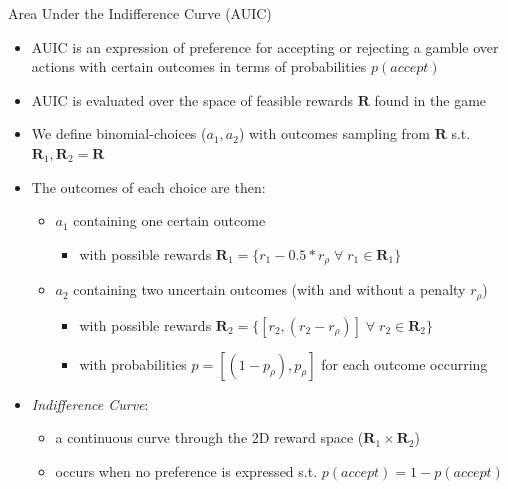 \documentclass[aspectratio=1610, xcolor=dvipsnames]{packages/beamer}
\begin{document}
\begin{frame}{Area Under the Indifference Curve (AUIC)}

        \begin{itemize}
            \item \ac{AUIC} is an expression of preference for accepting or rejecting a gamble over actions with certain outcomes in terms of probabilities $p(accept)$
            \item \ac{AUIC} is evaluated over the space of feasible rewards $\mathbf{R}$ found in the game
            \item We define binomial-choices ($a_1,a_2$) with outcomes sampling from $\mathbf{R}$ s.t. $\mathbf{R}_{1},\mathbf{R}_{2} = \mathbf{R}$
            \item The outcomes of each choice are then:
            \begin{itemize}
                \item $a_{1}$ containing one certain outcome
                \begin{itemize}
                    \item  with possible rewards $\mathbf{R}_{1} = \{r_1 -0.5*r_{\rho} \;\forall\; r_1 \in \mathbf{R}_{1}\}$
                \end{itemize}
                \item $a_{2}$ containing two uncertain outcomes (with and without a penalty $r_\rho$)
                \begin{itemize}
                    \item with possible rewards $\mathbf{R}_{2} = \{[r_2,(r_2 -r_\rho)] \;\forall\; r_2 \in\mathbf{R}_2\}$
                    \item with probabilities $p = [(1-p_{\rho}),p_{\rho}]$ for each outcome occurring
                \end{itemize}
            \end{itemize}
            \item \textit{Indifference Curve}:
            \begin{itemize}
                \item a continuous curve through the 2D reward space ($\mathbf{R}_{1} \times \mathbf{R}_{2}$)
                \item occurs when no preference is expressed s.t. $p(accept) = 1-p(accept)$
            \end{itemize}

        \end{itemize}
\end{frame}
\end{document}
